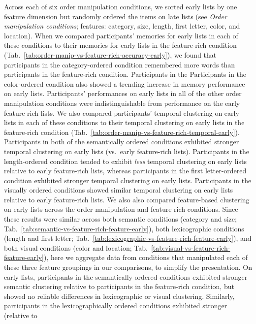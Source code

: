 \documentclass[11pt]{article}
\begin{document}
Across each of six order manipulation conditions, we sorted early lists by one
feature dimension but randomly ordered the items on late lists (see
\textit{Order manipulation conditions}; features: category, size, length, first
letter, color, and location). When we compared participants' memories for early
lists in each of these conditions to their memories for early lists in the
feature-rich condition
(Tab.~\ref{tab:order-manip-vs-feature-rich-accuracy-early}), we found that
participants in the category-ordered condition remembered more words than
participants in the feature-rich condition. Participants in the Participants in
the color-ordered condition also showed a trending increase in memory
performance on early lists. Participants' performances on early lists in all of
the other order manipulation conditions were indistinguishable from performance
on the early feature-rich lists. We also compared participants' temporal
clustering on early lists in each of these conditions to their temporal
clustering on early lists in the feature-rich condition
(Tab.~\ref{tab:order-manip-vs-feature-rich-temporal-early}). Participants in
both of the semantically ordered conditions exhibited stronger temporal
clustering on early lists (vs.~early feature-rich lists). Participants in the
length-ordered condition tended to exhibit \textit{less} temporal clustering on
early lists relative to early feature-rich lists, whereas participants in the
first letter-ordered condition exhibited stronger temporal clustering on early
lists. Participants in the visually ordered conditions showed similar temporal
clustering on early lists relative to early feature-rich lists. We also also
compared feature-based clustering on early lists across the order manipulation
and feature-rich conditions. Since these results were similar across both
semantic conditions (category and size;
Tab.~\ref{tab:semantic-vs-feature-rich-feature-early}), both lexicographic
conditions (length and first letter;
Tab.~\ref{tab:lexicographic-vs-feature-rich-feature-early}), and both visual
conditions (color and location;
Tab.~\ref{tab:visual-vs-feature-rich-feature-early}), here we aggregate data
from conditions that manipulated each of these three feature groupings in our
comparisons, to simplify the presentation. On early lists, participants in the
semantically ordered conditions exhibited stronger semantic clustering relative
to participants in the feature-rich condition, but showed no reliable
differences in lexicographic or visual clustering. Similarly, participants in
the lexicographically ordered conditions exhibited stronger (relative to
\end{document}
